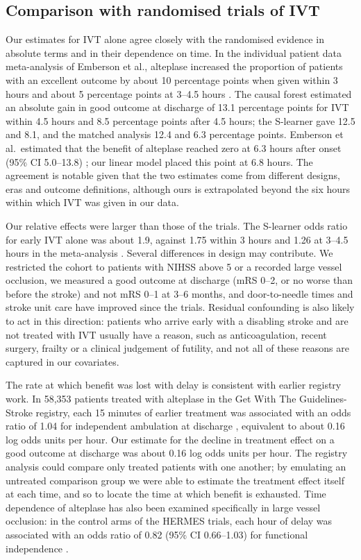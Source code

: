 \subsection{Comparison with randomised trials of IVT}

Our estimates for IVT alone agree closely with the randomised evidence in absolute terms and in their dependence on time. In the individual patient data meta-analysis of Emberson et al., alteplase increased the proportion of patients with an excellent outcome by about 10 percentage points when given within 3 hours and about 5 percentage points at 3--4.5 hours . The causal forest estimated an absolute gain in good outcome at discharge of 13.1 percentage points for IVT within 4.5 hours and 8.5 percentage points after 4.5 hours; the S-learner gave 12.5 and 8.1, and the matched analysis 12.4 and 6.3 percentage points. Emberson et al.\ estimated that the benefit of alteplase reached zero at 6.3 hours after onset (95\% CI 5.0--13.8) ; our linear model placed this point at 6.8 hours. The agreement is notable given that the two estimates come from different designs, eras and outcome definitions, although ours is extrapolated beyond the six hours within which IVT was given in our data.

Our relative effects were larger than those of the trials. The S-learner odds ratio for early IVT alone was about 1.9, against 1.75 within 3 hours and 1.26 at 3--4.5 hours in the meta-analysis . Several differences in design may contribute. We restricted the cohort to patients with NIHSS above 5 or a recorded large vessel occlusion, we measured a good outcome at discharge (mRS 0--2, or no worse than before the stroke) and not mRS 0--1 at 3--6 months, and door-to-needle times and stroke unit care have improved since the trials. Residual confounding is also likely to act in this direction: patients who arrive early with a disabling stroke and are not treated with IVT usually have a reason, such as anticoagulation, recent surgery, frailty or a clinical judgement of futility, and not all of these reasons are captured in our covariates.

The rate at which benefit was lost with delay is consistent with earlier registry work. In 58,353 patients treated with alteplase in the Get With The Guidelines-Stroke registry, each 15 minutes of earlier treatment was associated with an odds ratio of 1.04 for independent ambulation at discharge , equivalent to about 0.16 log odds units per hour. Our estimate for the decline in treatment effect on a good outcome at discharge was about 0.16 log odds units per hour. The registry analysis could compare only treated patients with one another; by emulating an untreated comparison group we were able to estimate the treatment effect itself at each time, and so to locate the time at which benefit is exhausted. Time dependence of alteplase has also been examined specifically in large vessel occlusion: in the control arms of the HERMES trials, each hour of delay was associated with an odds ratio of 0.82 (95\% CI 0.66--1.03) for functional independence .


